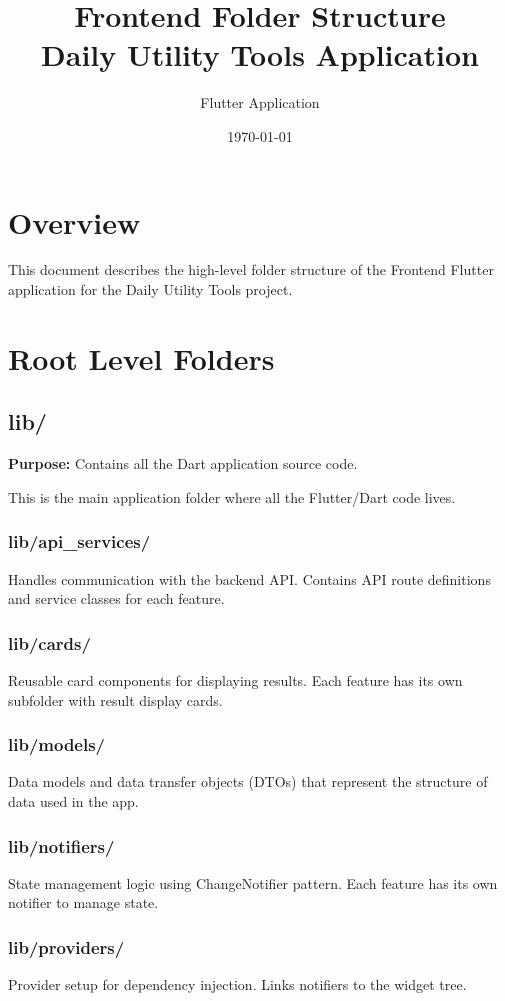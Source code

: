 \documentclass[12pt,a4paper]{article}
\title{\textbf{Frontend Folder Structure} \\ \Large Daily Utility Tools Application}
\author{Flutter Application}
\date{\today}
\begin{document}
\maketitle
\tableofcontents
\newpage

\section{Overview}
This document describes the high-level folder structure of the Frontend Flutter application for the Daily Utility Tools project.

\section{Root Level Folders}

\subsection{lib/}
\textbf{Purpose:} Contains all the Dart application source code.

This is the main application folder where all the Flutter/Dart code lives.

\subsubsection{lib/api\_services/}
Handles communication with the backend API. Contains API route definitions and service classes for each feature.

\subsubsection{lib/cards/}
Reusable card components for displaying results. Each feature has its own subfolder with result display cards.

\subsubsection{lib/models/}
Data models and data transfer objects (DTOs) that represent the structure of data used in the app.

\subsubsection{lib/notifiers/}
State management logic using ChangeNotifier pattern. Each feature has its own notifier to manage state.

\subsubsection{lib/providers/}
Provider setup for dependency injection. Links notifiers to the widget tree.
\end{document}
